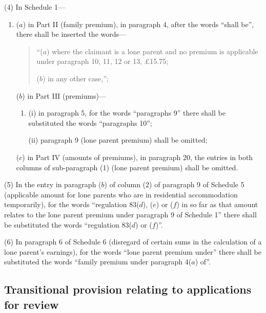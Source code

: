 \documentclass[a4paper]{article}
\begin{document}
(4) In Schedule 1---
\begin{enumerate}\item[]
($a$) in Part II (family premium), in paragraph 4, after the words “shall be”, there shall be inserted the words—
\begin{quotation}
“($a$) where the claimant is a lone parent and no premium is applicable under paragraph 10, 11, 12 or 13, £15.75;

($b$) in any other case,”;
\end{quotation}

($b$) in Part III (premiums)—
\begin{enumerate}\item[]
(i) in paragraph 5, for the words “paragraphs 9” there shall be substituted the words “paragraphs 10”;

(ii) paragraph 9 (lone parent premium) shall be omitted;
\end{enumerate}

($c$) in Part IV (amounts of premiums), in paragraph 20, the entries in both columns of sub-paragraph (1) (lone parent premium) shall be omitted.
\end{enumerate}

(5)  In the entry in paragraph ($b$) of column (2) of paragraph 9 of Schedule 5 (applicable amount for lone parents who are in residential accommodation temporarily), for the words “regulation 83($d$), ($e$) or ($f$) in so far as that amount relates to the lone parent premium under paragraph 9 of Schedule 1” there shall be substituted the words “regulation 83($d$) or ($f$)”.

(6)  In paragraph 6 of Schedule 6 (disregard of certain sums in the calculation of a lone parent’s earnings), for the words “lone parent premium under” there shall be substituted the words “family premium under paragraph 4($a$) of”.

\subsection[12. Transitional provision relating to applications for review]{Transitional provision relating to applications for review}
\end{document}
